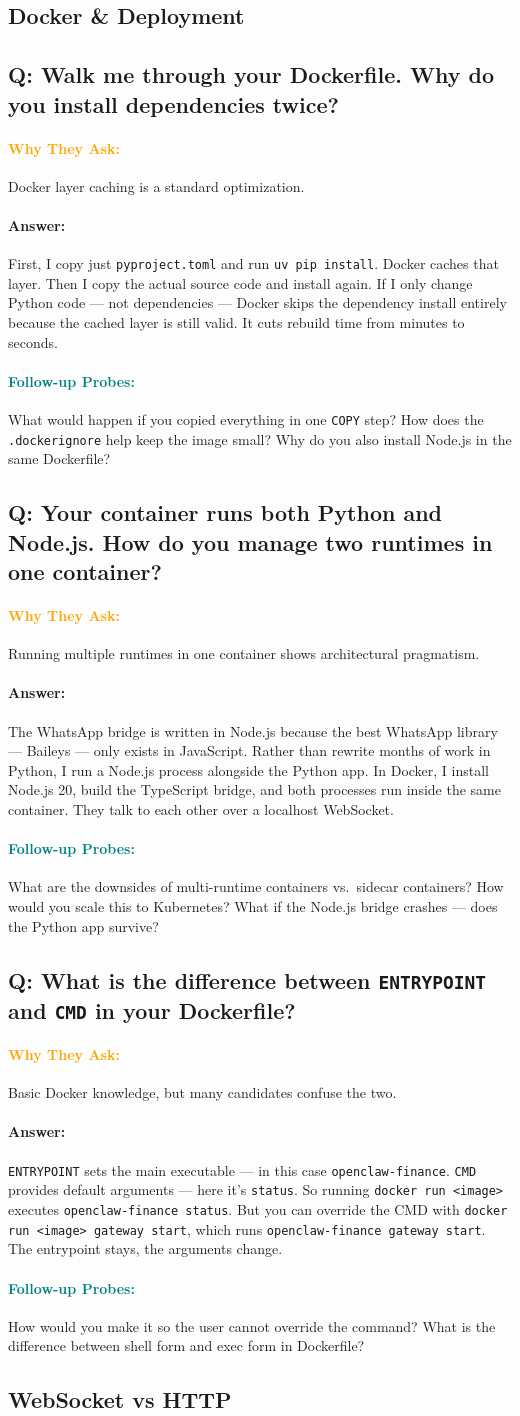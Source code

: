 \documentclass[11pt,a4paper]{article}
\newcommand{\Q}[1]{\subsection{#1}}
\newcommand{\Ans}[1]{\paragraph{\textbf{Answer:}} #1}
\newcommand{\Why}{\paragraph{\textcolor{orange}{\textbf{Why They Ask:}}}}
\newcommand{\Probe}{\paragraph{\textcolor{teal}{\textbf{Follow-up Probes:}}}}
\begin{document}
\subsection{Docker \& Deployment}

\Q{Q: Walk me through your Dockerfile. Why do you install dependencies twice?}
\Why Docker layer caching is a standard optimization.
\Ans First, I copy just \texttt{pyproject.toml} and run \texttt{uv pip install}. Docker caches that layer. Then I copy the actual source code and install again. If I only change Python code --- not dependencies --- Docker skips the dependency install entirely because the cached layer is still valid. It cuts rebuild time from minutes to seconds.
\Probe What would happen if you copied everything in one \texttt{COPY} step? How does the \texttt{.dockerignore} help keep the image small? Why do you also install Node.js in the same Dockerfile?

\Q{Q: Your container runs both Python and Node.js. How do you manage two runtimes in one container?}
\Why Running multiple runtimes in one container shows architectural pragmatism.
\Ans The WhatsApp bridge is written in Node.js because the best WhatsApp library --- Baileys --- only exists in JavaScript. Rather than rewrite months of work in Python, I run a Node.js process alongside the Python app. In Docker, I install Node.js 20, build the TypeScript bridge, and both processes run inside the same container. They talk to each other over a localhost WebSocket.
\Probe What are the downsides of multi-runtime containers vs.\ sidecar containers? How would you scale this to Kubernetes? What if the Node.js bridge crashes --- does the Python app survive?

\Q{Q: What is the difference between \texttt{ENTRYPOINT} and \texttt{CMD} in your Dockerfile?}
\Why Basic Docker knowledge, but many candidates confuse the two.
\Ans \texttt{ENTRYPOINT} sets the main executable --- in this case \texttt{openclaw-finance}. \texttt{CMD} provides default arguments --- here it's \texttt{status}. So running \texttt{docker run <image>} executes \texttt{openclaw-finance status}. But you can override the CMD with \texttt{docker run <image> gateway start}, which runs \texttt{openclaw-finance gateway start}. The entrypoint stays, the arguments change.
\Probe How would you make it so the user cannot override the command? What is the difference between shell form and exec form in Dockerfile?

\subsection{WebSocket vs HTTP}
\end{document}
